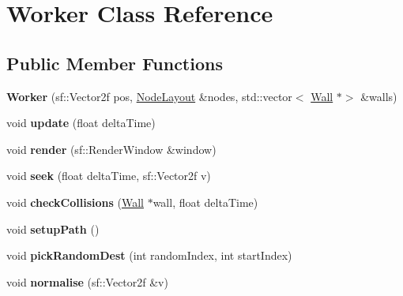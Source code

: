 \hypertarget{class_worker}{}\section{Worker Class Reference}
\label{class_worker}
\subsection*{Public Member Functions}
\begin{DoxyCompactItemize}
\item 
\mbox{\label{class_worker_abcca1d98cfe682b3c80be626f97c2fb2}} 
{\bfseries Worker} (sf\+::\+Vector2f pos, \mbox{\hyperlink{class_node_layout}{Node\+Layout}} \&nodes, std\+::vector$<$ \mbox{\hyperlink{class_wall}{Wall}} $\ast$$>$ \&walls)
\item 
\mbox{\label{class_worker_ad79617e69aff5ed4a22835f5e2b3cf7a}} 
void {\bfseries update} (float delta\+Time)
\item 
\mbox{\label{class_worker_a18940af5e921feefc2373e120d66ff24}} 
void {\bfseries render} (sf\+::\+Render\+Window \&window)
\item 
\mbox{\label{class_worker_a5d3aefa5dd3ad224ac861b4d69db95ed}} 
void {\bfseries seek} (float delta\+Time, sf\+::\+Vector2f v)
\item 
\mbox{\label{class_worker_aa28cb0d23b4fc8e4a9480bab8d4724cf}} 
void {\bfseries check\+Collisions} (\mbox{\hyperlink{class_wall}{Wall}} $\ast$wall, float delta\+Time)
\item 
\mbox{\label{class_worker_a1d02fa53eec27493717027977ffb6c54}} 
void {\bfseries setup\+Path} ()
\item 
\mbox{\label{class_worker_a6f0cfcb460a9bc7fa3b2f1fa5ecc8b8a}} 
void {\bfseries pick\+Random\+Dest} (int random\+Index, int start\+Index)
\item 
\mbox{\label{class_worker_ae9b32488617a0086772afd11529e3014}} 
void {\bfseries normalise} (sf\+::\+Vector2f \&v)
\item 
\mbox{\label{class_worker_afaf8d6984011df1daa5ef9cd53abb4cc}} 
$$
\end{DoxyCompactItemize}
